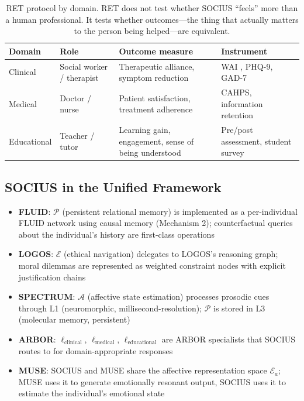 \documentclass[12pt]{article}
\begin{document}
\begin{table}[H]
\centering\footnotesize
\setlength{\tabcolsep}{4pt}
\begin{tabular}{@{}p{1.9cm}p{2.6cm}p{4.2cm}p{3.2cm}@{}}
\toprule
\textbf{Domain} & \textbf{Role} & \textbf{Outcome measure} & \textbf{Instrument} \\
\midrule
Clinical & Social worker / therapist & Therapeutic alliance, symptom reduction & WAI \cite{horvath1989}, PHQ-9, GAD-7 \\
Medical  & Doctor / nurse & Patient satisfaction, treatment adherence & CAHPS, information retention \\
Educational & Teacher / tutor & Learning gain, engagement, sense of being understood & Pre/post assessment, student survey \\
\bottomrule
\end{tabular}
\caption{RET protocol by domain. RET does not test whether SOCIUS ``feels'' more than a human professional. It tests whether outcomes---the thing that actually matters to the person being helped---are equivalent.}
\end{table}

\subsection{SOCIUS in the Unified Framework}

\begin{itemize}
    \item \textbf{FLUID}: $\mathcal{P}$ (persistent relational memory) is implemented as a per-individual FLUID network using causal memory (Mechanism 2); counterfactual queries about the individual's history are first-class operations
    \item \textbf{LOGOS}: $\mathcal{E}$ (ethical navigation) delegates to LOGOS's reasoning graph; moral dilemmas are represented as weighted constraint nodes with explicit justification chains
    \item \textbf{SPECTRUM}: $\mathcal{A}$ (affective state estimation) processes prosodic cues through L1 (neuromorphic, millisecond-resolution); $\mathcal{P}$ is stored in L3 (molecular memory, persistent)
    \item \textbf{ARBOR}: $\ell_{\text{clinical}}$, $\ell_{\text{medical}}$, $\ell_{\text{educational}}$ are ARBOR specialists that SOCIUS routes to for domain-appropriate responses
    \item \textbf{MUSE}: SOCIUS and MUSE share the affective representation space $\mathcal{E}_a$; MUSE uses it to generate emotionally resonant output, SOCIUS uses it to estimate the individual's emotional state
\end{itemize}
\end{document}
